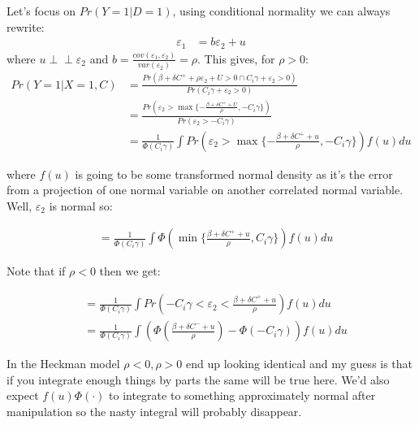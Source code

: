 \documentclass{article}
\newcommand{\indep}{\perp \!\!\! \perp}
\begin{document}
Let's focus on $Pr( Y = 1 | D = 1)$, using conditional normality we can always rewrite:
\begin{align*}
    \varepsilon_1 &= b\varepsilon_2 + u
\end{align*}
where $u \indep \varepsilon_2$ and $b = \frac{cov(\varepsilon_1, \varepsilon_2)}{var(\varepsilon_2)} = \rho$. 
This gives, for $\rho > 0$:
\begin{align*}
    Pr(Y = 1 | X = 1, C) &= \frac{Pr(\beta + \delta C^+ + \rho \varepsilon_2 + U > 0 \cap C_i \gamma + \varepsilon_2  > 0)}{
    Pr(C_i \gamma + \varepsilon_2 > 0)} \\
    &= \frac{Pr(\varepsilon_2 > \max \{ - \frac{\beta + \delta C^+ + U}{\rho}, -C_i \gamma\})}{
        Pr(\varepsilon_2 > -C_i \gamma)
    } \\
    &= \frac{1}{\Phi(C_i \gamma)} \int
    Pr(\varepsilon_2 > \max \{ - \frac{\beta + \delta C^+ + u}{\rho}, -C_i \gamma\}) f(u) du
\end{align*}


where $f(u)$ is going to be some transformed normal density as it's the error from a projection 
of one normal variable on another correlated normal variable. Well, $\varepsilon_2$ is 
normal so:

\begin{align*}
    &= \frac{1}{\Phi(C_i \gamma)} \int
    \Phi\left( \min \{  \frac{\beta + \delta C^+ + u}{\rho}, C_i \gamma\}\right) f(u) du
\end{align*}


Note that if $\rho < 0$ then we get:

\begin{align*}
    &= \frac{1}{\Phi(C_i \gamma)} \int
    Pr(-C_i \gamma < \varepsilon_2 <  \frac{\beta + \delta C^+ + u}{\rho}) f(u) du \\
    &= \frac{1}{\Phi(C_i \gamma)} \int \left(
    \Phi\left(\frac{\beta + \delta C^- + u}{\rho}\right) - \Phi(-C_i \gamma)\right) f(u) du 
\end{align*}

In the Heckman model $\rho < 0, \rho > 0$ end up looking identical and my guess is 
that if you integrate enough things by parts the same will be true here. We'd also 
expect $f(u) \Phi(\cdot)$ to integrate to something approximately normal after 
manipulation so the nasty integral will probably disappear.
\end{document}

